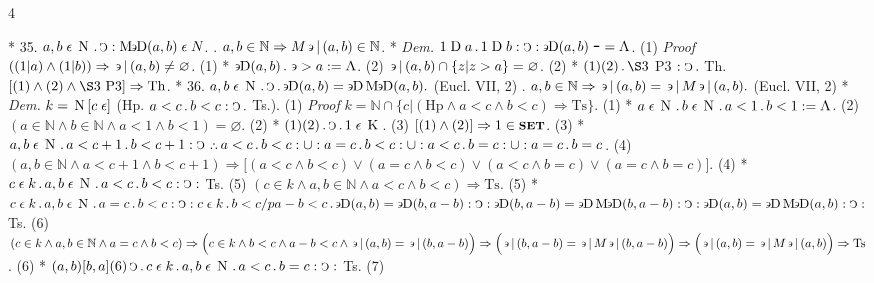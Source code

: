 \documentclass{book}
\newcommand{\s}{\switchcolumn} %
\newcommand{\C}{\mathop{\sbox0{$\displaystyle$$\reflectbox{C}$} %
\raisebox{-\height+\ht0-0.05cm}[\ht0][\dp0]{\scalebox{0.8}[0.8]{\copy0}}}\displaylimits} %
\newcommand{\p}{\mathop{\sbox0{$\displaystyle$$.$}
\raisebox{-\height+\ht0}[\ht0][\dp0]{\scalebox{1}[1]{\copy0}}}\displaylimits} %
\newcommand{\pppNoSpace}{\leavevmode\lower0ex\hbox{.}\kern-0.1em\raise0.7ex\hbox{.}\kern-0.1em\lower0ex\hbox{.}} %
\newcommand{\ppp}{\thinspace \pppNoSpace\thinspace} %
\newcommand{\no}{\mathop{\thinspace \scalebox{1.5}{-}}}
\newcommand{\abs}{\mathop{\rotatebox[origin=c]{180}{V}}}
\newcommand{\larger}{\mathrel{>}}
\newcommand{\smaller}{\mathrel{<}}
\newcommand{\such}{\thinspace \rotatebox[origin=c]{180}{$\epsilon$}}
\newcommand{\smallIn}{\ensuremath{\mathrel{\epsilon}}}
\newcommand{\divSet}{\mathop{\rotatebox[origin=c]{180}{$\epsilon$}\mkern-1mu\text{D}}}
\newcommand{\maxDiv}{\mathop{\text{M}\mkern-1mu\rotatebox[origin=c]{180}{$\epsilon$}\mkern-1mu\text{D}}}
\newcommand{\D}{\mathrel{\text{D}}}
\newcommand{\K}{\mathop{\thinspace \text{K} \thinspace}}
\newcommand{\N}{\mathop{\thinspace \text{N} \thinspace}}
\newcommand{\setOfSets}{\mathop{\text{{\footnotesize \textbf{SET}}}}}
\renewcommand{\rightarrow}{\Rightarrow}
\newenvironment{translateFourCol}[4]
               { %
                 \setcolumnwidth{#1\fill/1em, #2\fill/\columnsep, #3\fill/1em, #4\fill}
                 \begin{paracol}{4}
                 \newcommand{\LAT}{\switchcolumn[0]*}
                 \newcommand{\ENG}{\switchcolumn[2]}
               }
               { %
                 \let\ENG\undefined
                 \let\LAT\undefined
                 \end{paracol}
               }
\begin{document}
\begin{translateFourCol}{0.08}{0.42}{0.08}{0.42}
\LAT
35. \s $a,b \smallIn \N \p \C : \maxDiv (a,b) \smallIn N$.
\ENG
35. \s $a,b \in \mathbb{N} \rightarrow M \such\,|\,(a,b) \in \mathbb{N}$.
\LAT
\emph{Dem.} \s $1 \D a \p 1 \D b : \C : \divSet (a,b) \no = \abs$. \hfill (1)
\ENG
\emph{Proof} \s $((1 | a) \wedge (1 | b)) \rightarrow \such\,|\,(a,b) \neq \varnothing$. \hfill (1)
\LAT
\s $\divSet (a,b) \p \such \larger a : = \abs$. \hfill (2)
\ENG
\s $\such\,|\,(a,b) \cap \{ z | z > a \} = \varnothing$. \hfill (2)
\LAT
\s $(1)(2) \p \S3$ P3 $: \C \p$ Th.
\ENG
\s $[(1) \wedge (2) \wedge \S3\ \text{P3}] \rightarrow \text{Th}$.
\LAT
36. \s $a,b \smallIn \N \p \C \p \divSet (a,b) = \divSet \maxDiv (a,b).$ \hfill (Eucl. VII, 2)
\ENG
36. \s $a,b \in \mathbb{N} \rightarrow \such\,|\,(a,b) = \such\,|\,M \such\,|\,(a,b).$ \hfill (Eucl. VII, 2)
\LAT
\emph{Dem.} \s $k = \N [c \smallIn]$ (Hp. $a \smaller c \p b \smaller c : \C \p$ Ts.). \hfill (1)
\ENG
\emph{Proof} \s $k = \mathbb{N} \cap \{ c | (\text{Hp} \wedge a < c \wedge b < c) \rightarrow \text{Ts} \}$. \hfill (1)
\LAT
\s $a \smallIn \N \p b \smallIn \N \p a \smaller 1 \p b \smaller 1 : = \abs$. \hfill (2)
\ENG
\s $(a \in \mathbb{N} \wedge b \in \mathbb{N} \wedge a < 1 \wedge b < 1) = \varnothing$. \hfill (2)
\LAT
\s $ (1)(2) \p \C \p 1 \smallIn \K$. \hfill (3)
\ENG
\s $[(1) \wedge (2)] \rightarrow 1 \in \setOfSets$. \hfill (3)
\LAT
\s $a,b \smallIn \N \p a \smaller c + 1 \p b \smaller c + 1 : \C \ppp a \smaller c \p b \smaller c : \cup : a = c \p b \smaller c : \cup : a \smaller c \p b = c : \cup : a = c \p b = c$. \hfill (4)
\ENG
\s $(a,b \in \mathbb{N} \wedge a < c + 1 \wedge b < c + 1) \rightarrow \Big[ (a < c \wedge b < c) \vee (a = c \wedge b < c) \vee (a < c \wedge b = c) \vee (a = c \wedge b = c) \Big]$. \hfill (4)
\LAT
\s $c \smallIn k \p a,b \smallIn \N \p a < c \p b < c : \C :$ Ts. \hfill (5)
\ENG
\s $(c \in k \wedge a,b \in \mathbb{N} \wedge a < c \wedge b < c) \rightarrow \text{Ts}$. \hfill (5)
\LAT
\s $c \smallIn k \p a,b \smallIn \N \p a = c \p b \smaller c : \C : c \smallIn k \p b \smaller c /p a - b \smaller c \p \divSet (a,b) = \divSet (b,a-b) : \C : \divSet (b, a-b) = \divSet \maxDiv (b,a-b) : \C : \divSet (a,b) = \divSet \maxDiv (a,b) : \C :$ Ts. \hfill (6)
\ENG
\s $(c \in k \wedge a,b \in \mathbb{N} \wedge a = c \wedge b < c) \rightarrow \Big( c \in k \wedge b < c \wedge a - b < c \wedge \such\,|\,(a,b) = \such\,|\,(b,a-b) \Big) \rightarrow \Big( \such\,|\,(b, a-b) = \such\,|\,M \such\,|\,(b,a-b) \Big) \rightarrow \Big( \such\,|\,(a,b) = \such\,|\,M \such\,|\,(a,b) \Big) \rightarrow \text{Ts}$. \hfill (6)
\LAT
\s $(a,b) [b,a] (6) \C \p c \smallIn k \p a,b \smallIn \N \p a \smaller c \p b = c : \C :$ Ts. \hfill (7)

\end{translateFourCol}
\end{document}

